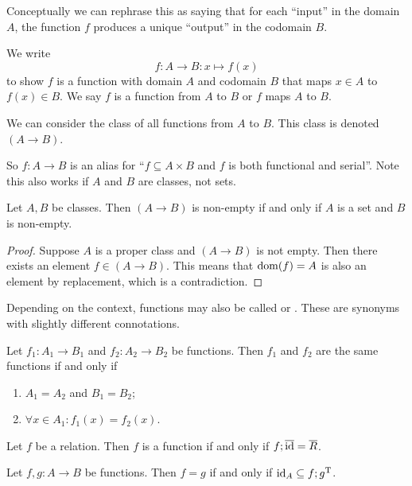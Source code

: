 Conceptually we can rephrase this as saying that for each ``input'' in the domain $A$, the function $f$ produces a unique ``output'' in the codomain $B$.

\begin{note}
We write
\[f:A \to B: x\mapsto f(x) \]
to show $f$ is a function with domain $A$ and codomain $B$ that maps $x\in A$ to $f(x)\in B$. We say $f$ is a function from $A$ to $B$ or $f$ maps $A$ to $B$. 

We can consider the class of all functions from $A$ to $B$. This class is denoted $(A\to B)$.
\end{note}

So $f: A\to B$ is an alias for ``$f\subseteq A\times B$ and $f$ is both functional and serial''. Note this also works if $A$ and $B$ are classes, not sets.

\begin{lemma}
Let $A,B$ be classes. Then $(A\to B)$ is non-empty \textup{if and only if} $A$ is a set and $B$ is non-empty.
\end{lemma}
\begin{proof}
Suppose $A$ is a proper class and $(A\to B)$ is not empty. Then there exists an element $f\in (A\to B)$. This means that $\operatorname{dom}(f) = A$ is also an element by replacement, which is a contradiction.
\end{proof}

Depending on the context, functions may also be called  or . These are synonyms with slightly different connotations.

\begin{lemma}
Let $f_1: A_1\to B_1$ and $f_2: A_2\to B_2$ be functions. Then $f_1$ and $f_2$ are the same functions \textup{if and only if}
\begin{enumerate}
\item $A_1 = A_2$ and $B_1 = B_2$;
\item $\forall x\in A_1: f_1(x) = f_2(x)$.
\end{enumerate}
\end{lemma}

\begin{lemma}
Let $f$ be a relation. Then $f$ is a function \textup{if and only if} $f;\overline{\operatorname{id}} = \overline{R}$.
\end{lemma}

\begin{lemma} \label{functionEqualityIdComparison}
Let $f,g: A\to B$ be functions. Then $f = g$ \textup{if and only if} $\operatorname{id}_A \subseteq f;g^{\mathrm{T}}$.
\end{lemma}


